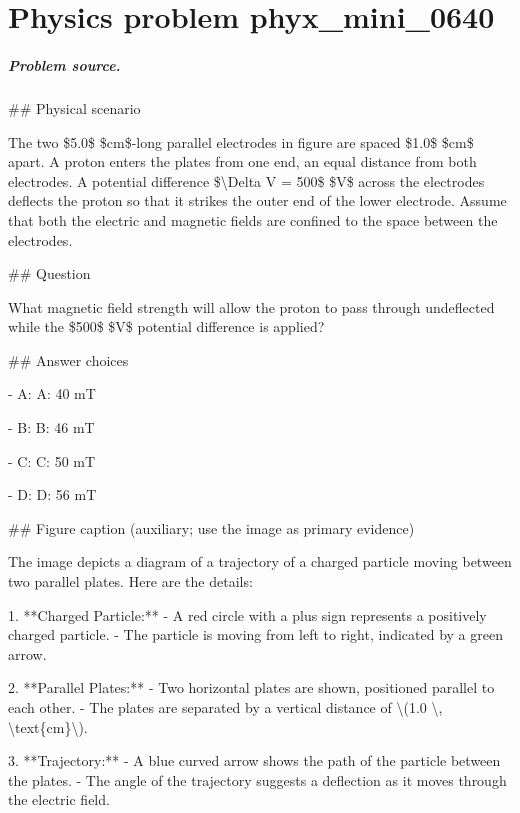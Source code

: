 
\chapter{Physics problem phyx\_mini\_0640}
\label{ch:PhyXMiniProblems_problem_phyx_mini_0640}

\paragraph{Problem source.}
\#\# Physical scenario

The two \$5.0\$ \$cm\$-long parallel electrodes in figure are spaced \$1.0\$ \$cm\$ apart. A proton enters the plates from one end, an equal distance from both electrodes. A potential difference \$\textbackslash{}Delta V = 500\$ \$V\$ across the electrodes deflects the proton so that it strikes the outer end of the lower electrode. Assume that both the electric and magnetic fields are confined to the space between the electrodes.

\#\# Question

What magnetic field strength will allow the proton to pass through undeflected while the \$500\$ \$V\$ potential difference is applied?

\#\# Answer choices

- A: A: 40 mT

- B: B: 46 mT

- C: C: 50 mT

- D: D: 56 mT

\#\# Figure caption (auxiliary; use the image as primary evidence)

The image depicts a diagram of a trajectory of a charged particle moving between two parallel plates. Here are the details:

1. **Charged Particle:**
   - A red circle with a plus sign represents a positively charged particle.
   - The particle is moving from left to right, indicated by a green arrow.

2. **Parallel Plates:**
   - Two horizontal plates are shown, positioned parallel to each other.
   - The plates are separated by a vertical distance of \textbackslash{}(1.0 \textbackslash{}, \textbackslash{}text\{cm\}\textbackslash{}).

3. **Trajectory:**
   - A blue curved arrow shows the path of the particle between the plates.
   - The angle of the trajectory suggests a deflection as it moves through the electric field.

